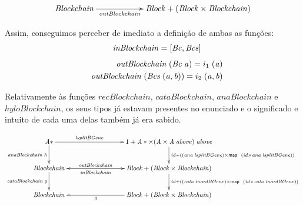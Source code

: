\documentclass[a4paper]{article}
\newcommand{\Conid}[1]{\mathit{#1}}
\newcommand{\Varid}[1]{\mathit{#1}}
\begin{document}
\begin{eqnarray*}
\xymatrix@C=2cm{
     \ensuremath{\Conid{Blockchain}}
           \ar[r]_-{\ensuremath{\Varid{outBlockchain}}}
&
     \ensuremath{\Conid{Block}\mathbin{+}(\Conid{Block}\times\Conid{Blockchain})}
}
\end{eqnarray*}

Assim, conseguimos perceber de imediato a definição de ambas as funções:
\begin{eqnarray*}
\start
\ensuremath{\Varid{inBlockchain}\mathrel{=}\alt{\Conid{Bc}}{\Conid{Bcs}}}
\end{eqnarray*}
\begin{eqnarray*}
\start
\ensuremath{\Varid{outBlockchain}\;(\Conid{Bc}\;\Varid{a})\mathrel{=}i_1\;(\Varid{a})}
\more
\ensuremath{\Varid{outBlockchain}\;(\Conid{Bcs}\;(\Varid{a},\Varid{b}))\mathrel{=}i_2\;(\Varid{a},\Varid{b})}
\end{eqnarray*}

Relativamente às funções \ensuremath{\Varid{recBlockchain}}, \ensuremath{\Varid{cataBlockchain}},
\ensuremath{\Varid{anaBlockchain}} e \ensuremath{\Varid{hyloBlockchain}}, os seus tipos já estavam presentes
no enunciado e o significado e intuito de cada uma delas também já era sabido.

\begin{eqnarray*}
\xymatrix@C=3cm{
   \ensuremath{\Conid{A}\mathbin{*}}
          \ar[d]_-{\ensuremath{\Varid{anaBlockchain}\;\Varid{h}}}
           \ar[r]^-{\ensuremath{\Varid{lsplitBGene}}}
&
   \ensuremath{\mathrm{1}\mathbin{+}\Conid{A}\mathbin{*}\times(\Conid{A}\times\Conid{A}\;\Varid{above})\;\Varid{above}}
          \ar[d]^{\ensuremath{\Varid{id}\mathbin{+}((\Varid{ana}\;\Varid{lsplitBGene})\times\map \;(\Varid{id}\times\Varid{ana}\;\Varid{lsplitBGene}))}}
\\
    \ensuremath{\Conid{Blockchain}}
       \ar[d]_-{\ensuremath{\Varid{cataBlockchain}\;\Varid{g}}}
       \ar[r]^-{\ensuremath{\Varid{outBlockchain}}}
&
    \ensuremath{\Conid{Block}\mathbin{+}(\Conid{Block}\times\Conid{Blockchain})}
          \ar[l]^-{\ensuremath{\Varid{inBlockchain}}}
           \ar[d]^{\ensuremath{\Varid{id}\mathbin{+}((\Varid{cata}\;\Varid{inordBGene})\times\map \;(\Varid{id}\times\Varid{cata}\;\Varid{inordBGene}))}}
\\
   \ensuremath{\Conid{Blockchain}}
&
   \ensuremath{\Conid{Block}\mathbin{+}(\Conid{Block}\times\Conid{Blockchain})}
       \ar[l]^-{\ensuremath{\Varid{g}}}
}
\end{eqnarray*}
\end{document}
